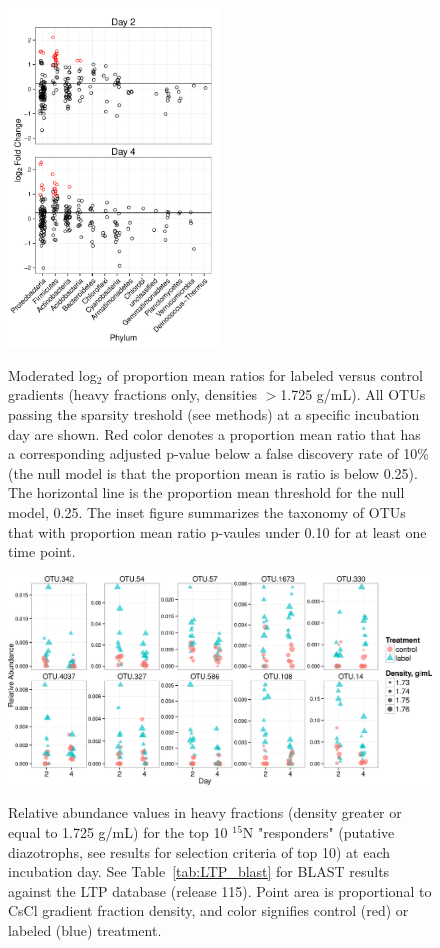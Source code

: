 \begin{figure}[H]
  \centering
  \caption{Moderated log$_{2}$ of proportion mean ratios for labeled versus
  control gradients (heavy fractions only, densities $>$1.725 g/mL). All OTUs
  passing the sparsity treshold (see methods) at a specific incubation day are
  shown. Red color denotes a proportion mean ratio that has a corresponding
  adjusted p-value below a false discovery rate of 10\% (the null model is that
  the proportion mean is ratio is below 0.25). The horizontal line is the
  proportion mean threshold for the null model, 0.25. The inset figure
  summarizes the taxonomy of OTUs that with proportion mean ratio p-vaules
  under 0.10 for at least one time point.}
  \includegraphics[width=0.5\textwidth]{figures/l2fc/l2fc.pdf}
  \label{fig:l2fc}
\end{figure}

\begin{figure}[H]
  \centering
    \caption{Relative abundance values in heavy fractions (density greater or
    equal to 1.725 g/mL) for the top 10 $^{15}$N "responders" (putative
    diazotrophs, see results for selection criteria of top 10) at each
    incubation day. See Table~\ref{tab:LTP_blast} for BLAST results against 
    the LTP database (release 115). Point area is proportional to CsCl gradient
    fraction density, and color signifies control (red) or labeled (blue)
    treatment.}
    \includegraphics[width=1.0\textwidth]{figures/scatter_heavy_topN2/scatter_heavy_topN.png}
  \label{fig:scatter_heavy}
\end{figure}

